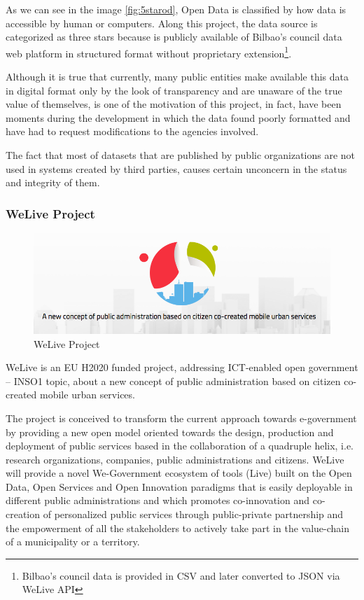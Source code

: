 \documentclass{DeustoFDP}
\begin{document}
As we can see in the image \ref{fig:5starod}, Open Data is classified by how data is accessible by human or computers. Along this project, the data source is categorized as three stars because is publicly available of Bilbao's council data web platform \cite{Bilbao Open Data} in structured format without proprietary extension\footnote{Bilbao's council data is provided in CSV and later converted to JSON via WeLive API}. 

Although it is true that currently, many public entities make available this data in digital format only by the look of transparency and are unaware of the true value of themselves, is one of the motivation of this project, in fact, have been moments during the development in which the data found poorly formatted and have had to request modifications to the agencies involved.

The fact that most of datasets that are published by public organizations are not used in systems created by third parties, causes certain unconcern in the status and integrity of them.

\subsubsection{WeLive Project}
\begin{figure}[h]
\centering
\includegraphics[width=0.7\linewidth]{fig/welive}
\caption[WeLive Project]{WeLive Project}
\label{fig:welive}
\end{figure}


WeLive is an EU H2020 funded project, addressing ICT-enabled open government – INSO1 topic, about a new concept of public administration based on citizen co-created mobile urban services.

The project is conceived to transform the current approach towards e-government by providing a new open model oriented towards the design, production and deployment of public services based in the collaboration of a quadruple helix, i.e. research organizations, companies, public administrations and citizens. WeLive will provide a novel We-Government ecosystem of tools (Live) built on the Open Data, Open Services and Open  Innovation paradigms that is easily deployable in different public administrations and which promotes co-innovation and co-creation of personalized public services through public-private partnership and the  empowerment of all the stakeholders to actively take part in the value-chain of a municipality or a territory. \cite{WeLive}
\end{document}
